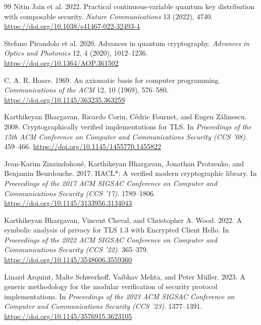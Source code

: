 \documentclass[conference,compsoc]{IEEEtran}
\begin{document}
\begin{thebibliography}{99}
Nitin Jain et al.
2022.
Practical continuous-variable quantum key distribution with composable security.
\emph{Nature Communications} 13 (2022), 4740.
\url{https://doi.org/10.1038/s41467-022-32493-4}

Stefano Pirandola et al.
2020.
Advances in quantum cryptography.
\emph{Advances in Optics and Photonics} 12, 4 (2020), 1012--1236.
\url{https://doi.org/10.1364/AOP.361502}

C. A. R. Hoare.
1969.
An axiomatic basis for computer programming.
\emph{Communications of the ACM} 12, 10 (1969), 576--580.
\url{https://doi.org/10.1145/363235.363259}

Karthikeyan Bhargavan, Ricardo Corin, C\'edric Fournet, and Eugen Z\u{a}linescu.
2008.
Cryptographically verified implementations for TLS.
In \emph{Proceedings of the 15th ACM Conference on Computer and Communications Security (CCS '08)}. 459--466.
\url{https://doi.org/10.1145/1455770.1455822}

Jean-Karim Zinzindohou\'e, Karthikeyan Bhargavan, Jonathan Protzenko, and Benjamin Beurdouche.
2017.
HACL*: A verified modern cryptographic library.
In \emph{Proceedings of the 2017 ACM SIGSAC Conference on Computer and Communications Security (CCS '17)}. 1789--1806.
\url{https://doi.org/10.1145/3133956.3134043}

Karthikeyan Bhargavan, Vincent Cheval, and Christopher A. Wood.
2022.
A symbolic analysis of privacy for TLS 1.3 with Encrypted Client Hello.
In \emph{Proceedings of the 2022 ACM SIGSAC Conference on Computer and Communications Security (CCS '22)}. 365--379.
\url{https://doi.org/10.1145/3548606.3559360}

Linard Arquint, Malte Schwerhoff, Vaibhav Mehta, and Peter M\"uller.
2023.
A generic methodology for the modular verification of security protocol implementations.
In \emph{Proceedings of the 2023 ACM SIGSAC Conference on Computer and Communications Security (CCS '23)}. 1377--1391.
\url{https://doi.org/10.1145/3576915.3623105}

\end{thebibliography}
\endgroup
\end{document}
